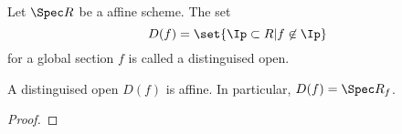 \begin{definition}
Let $\Spec R$ be a affine scheme.
The set \[D(f)=\set{\Ip \subset R | f\not\in\Ip}\] for a global section $f$ is called a distinguised open.
\end{definition}

\begin{lemma}
A distinguised open $D(f)$ is affine.
In particular, $D(f) = \Spec R_f$.
\end{lemma}

\begin{proof}
\end{proof}